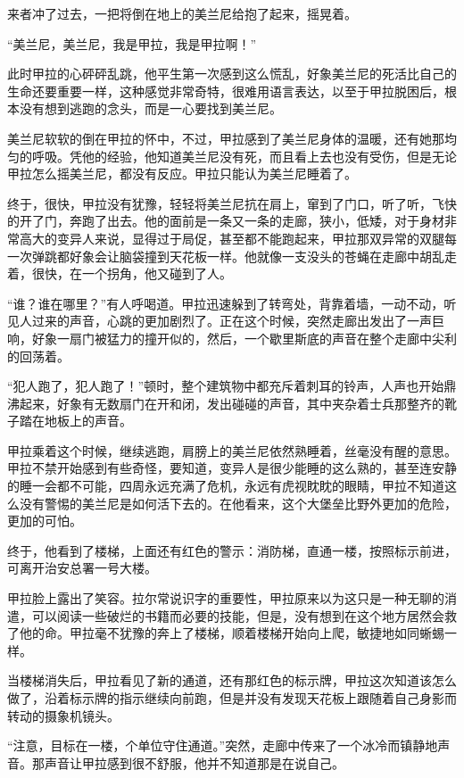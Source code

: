 来者冲了过去，一把将倒在地上的美兰尼给抱了起来，摇晃着。

“美兰尼，美兰尼，我是甲拉，我是甲拉啊！”

此时甲拉的心砰砰乱跳，他平生第一次感到这么慌乱，好象美兰尼的死活比自己的生命还要重要一样，这种感觉非常奇特，很难用语言表达，以至于甲拉脱困后，根本没有想到逃跑的念头，而是一心要找到美兰尼。

美兰尼软软的倒在甲拉的怀中，不过，甲拉感到了美兰尼身体的温暖，还有她那均匀的呼吸。凭他的经验，他知道美兰尼没有死，而且看上去也没有受伤，但是无论甲拉怎么摇美兰尼，都没有反应。甲拉只能认为美兰尼睡着了。

终于，很快，甲拉没有犹豫，轻轻将美兰尼抗在肩上，窜到了门口，听了听，飞快的开了门，奔跑了出去。他的面前是一条又一条的走廊，狭小，低矮，对于身材非常高大的变异人来说，显得过于局促，甚至都不能跑起来，甲拉那双异常的双腿每一次弹跳都好象会让脑袋撞到天花板一样。他就像一支没头的苍蝇在走廊中胡乱走着，很快，在一个拐角，他又碰到了人。

“谁？谁在哪里？”有人呼喝道。甲拉迅速躲到了转弯处，背靠着墙，一动不动，听见人过来的声音，心跳的更加剧烈了。正在这个时候，突然走廊出发出了一声巨响，好象一扇门被猛力的撞开似的，然后，一个歇里斯底的声音在整个走廊中尖利的回荡着。

“犯人跑了，犯人跑了！”顿时，整个建筑物中都充斥着刺耳的铃声，人声也开始鼎沸起来，好象有无数扇门在开和闭，发出碰碰的声音，其中夹杂着士兵那整齐的靴子踏在地板上的声音。

甲拉乘着这个时候，继续逃跑，肩膀上的美兰尼依然熟睡着，丝毫没有醒的意思。甲拉不禁开始感到有些奇怪，要知道，变异人是很少能睡的这么熟的，甚至连安静的睡一会都不可能，四周永远充满了危机，永远有虎视眈眈的眼睛，甲拉不知道这么没有警惕的美兰尼是如何活下去的。在他看来，这个大堡垒比野外更加的危险，更加的可怕。

终于，他看到了楼梯，上面还有红色的警示：消防梯，直通一楼，按照标示前进，可离开治安总署一号大楼。

甲拉脸上露出了笑容。拉尔常说识字的重要性，甲拉原来以为这只是一种无聊的消遣，可以阅读一些破烂的书籍而必要的技能，但是，没有想到在这个地方居然会救了他的命。甲拉毫不犹豫的奔上了楼梯，顺着楼梯开始向上爬，敏捷地如同蜥蜴一样。

当楼梯消失后，甲拉看见了新的通道，还有那红色的标示牌，甲拉这次知道该怎么做了，沿着标示牌的指示继续向前跑，但是并没有发现天花板上跟随着自己身影而转动的摄象机镜头。

“注意，目标在一楼，个单位守住通道。”突然，走廊中传来了一个冰冷而镇静地声音。那声音让甲拉感到很不舒服，他并不知道那是在说自己。

